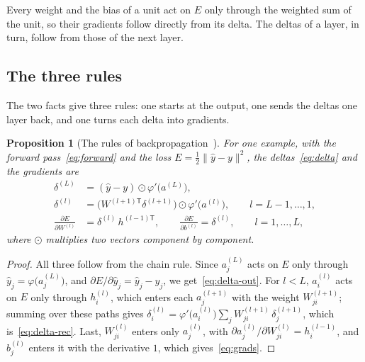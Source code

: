\documentclass[11pt,a4paper]{amsart}
\numberwithin{equation}{section}
\theoremstyle{plain}
\newtheorem{proposition}[theorem]{Proposition}
\theoremstyle{definition}
\theoremstyle{remark}
\newcommand{\T}{\mathsf{T}}
\newcommand{\had}{\odot}
\newcommand{\norm}[1]{\lVert #1 \rVert}
\begin{document}
Every weight and the bias of a unit act on $E$ only through the weighted
sum of the unit, so their gradients follow directly from its delta. The
deltas of a layer, in turn, follow from those of the next layer.

\subsection{The three rules}\label{sec:rules}

The two facts give three rules: one starts at the output, one sends the
deltas one layer back, and one turns each delta into gradients.

\begin{proposition}[The rules of backpropagation~{\cite{rumelhart1986}}]
\label{prop:backprop}
For one example, with the forward pass~\eqref{eq:forward} and the loss
$E = \tfrac12 \norm{\hat y - y}^2$, the deltas~\eqref{eq:delta} and the
gradients are
\begin{align}
  \delta^{(L)} &= (\hat y - y) \had \varphi'\bigl(a^{(L)}\bigr),
    \label{eq:delta-out}\\
  \delta^{(l)} &= \bigl(W^{(l+1)\T} \delta^{(l+1)}\bigr) \had
    \varphi'\bigl(a^{(l)}\bigr), \qquad l = L-1, \dots, 1,
    \label{eq:delta-rec}\\
  \frac{\partial E}{\partial W^{(l)}} &= \delta^{(l)}\, h^{(l-1)\T},
    \qquad \frac{\partial E}{\partial b^{(l)}} = \delta^{(l)},
    \qquad l = 1, \dots, L, \label{eq:grads}
\end{align}
where $\had$ multiplies two vectors component by component.
\end{proposition}

\begin{proof}
All three follow from the chain rule. Since $a^{(L)}_j$ acts on $E$ only
through $\hat y_j = \varphi\bigl(a^{(L)}_j\bigr)$, and
$\partial E / \partial \hat y_j = \hat y_j - y_j$, we
get~\eqref{eq:delta-out}. For $l < L$, $a^{(l)}_i$ acts on $E$ only
through $h^{(l)}_i$, which enters each $a^{(l+1)}_j$ with the weight
$W^{(l+1)}_{ji}$; summing over these paths gives
$\delta^{(l)}_i = \varphi'\bigl(a^{(l)}_i\bigr) \sum_j W^{(l+1)}_{ji}\,
\delta^{(l+1)}_j$, which is~\eqref{eq:delta-rec}. Last, $W^{(l)}_{ji}$
enters only $a^{(l)}_j$, with
$\partial a^{(l)}_j / \partial W^{(l)}_{ji} = h^{(l-1)}_i$, and
$b^{(l)}_j$ enters it with the derivative $1$, which
gives~\eqref{eq:grads}.
\end{proof}
\end{document}
